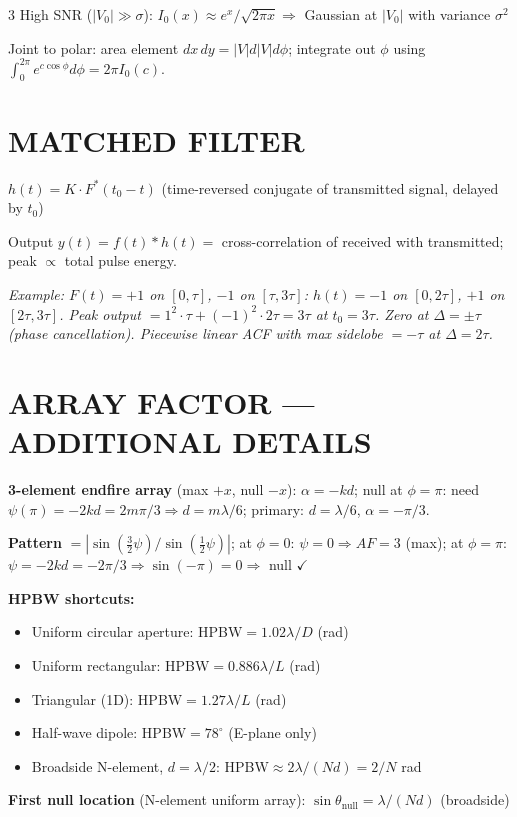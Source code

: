 \documentclass[6pt,landscape]{article}
\begin{document}
\begin{multicols}{3}
High SNR ($|V_0|\gg\sigma$): $I_0(x)\approx e^x/\sqrt{2\pi x}\Rightarrow$ Gaussian at $|V_0|$ with variance $\sigma^2$

Joint to polar: area element $dx\,dy=|V|d|V|d\phi$; integrate out $\phi$ using $\int_0^{2\pi}e^{c\cos\phi}d\phi=2\pi I_0(c)$.

\section*{MATCHED FILTER}
$h(t)=K\cdot F^*(t_0-t)$ (time-reversed conjugate of transmitted signal, delayed by $t_0$)

Output $y(t)=f(t)*h(t)=$ cross-correlation of received with transmitted; peak $\propto$ total pulse energy.

\textit{Example: $F(t)=+1$ on $[0,\tau]$, $-1$ on $[\tau,3\tau]$: $h(t)=-1$ on $[0,2\tau]$, $+1$ on $[2\tau,3\tau]$. Peak output $= 1^2\cdot\tau+(-1)^2\cdot2\tau=3\tau$ at $t_0=3\tau$. Zero at $\Delta=\pm\tau$ (phase cancellation). Piecewise linear ACF with max sidelobe $=-\tau$ at $\Delta=2\tau$.}

\section*{ARRAY FACTOR — ADDITIONAL DETAILS}
\textbf{3-element endfire array} (max $+x$, null $-x$): $\alpha=-kd$; null at $\phi=\pi$: need $\psi(\pi)=-2kd=2m\pi/3\Rightarrow d=m\lambda/6$; primary: $d=\lambda/6$, $\alpha=-\pi/3$.

\textbf{Pattern} $=|\sin(\frac{3}{2}\psi)/\sin(\frac{1}{2}\psi)|$; at $\phi=0$: $\psi=0\Rightarrow AF=3$ (max); at $\phi=\pi$: $\psi=-2kd=-2\pi/3\Rightarrow\sin(-\pi)=0\Rightarrow$ null $\checkmark$

\textbf{HPBW shortcuts:}
\begin{itemize}
\item Uniform circular aperture: HPBW$=1.02\lambda/D$ (rad)
\item Uniform rectangular: HPBW$=0.886\lambda/L$ (rad)
\item Triangular (1D): HPBW$=1.27\lambda/L$ (rad)
\item Half-wave dipole: HPBW$=78^\circ$ (E-plane only)
\item Broadside N-element, $d=\lambda/2$: HPBW$\approx2\lambda/(Nd)=2/N$ rad
\end{itemize}

\textbf{First null location} (N-element uniform array): $\sin\theta_\text{null}=\lambda/(Nd)$ (broadside)


\end{multicols}
\end{document}
